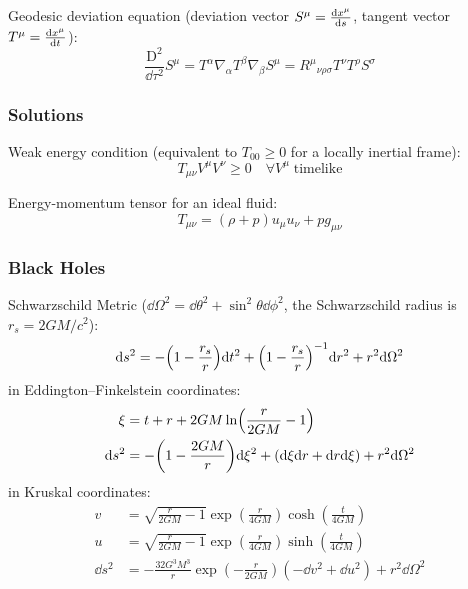 			\noindent
			Geodesic deviation equation (deviation vector $S^\mu = \dv{x^\mu}{s}$, tangent vector $T^\mu = \dv{x^\mu}{t}$):
			\begin{equation}
				\frac{\mathrm{D}^2}{\dd \tau^2} S^\mu
				= T^\alpha \nabla_\alpha T^\beta \nabla_\beta S^\mu
				= R^\mu{}_{\nu\rho\sigma} T^\nu T^\rho S^\sigma
			\end{equation}


		\subsubsection{Solutions}
			Weak energy condition (equivalent to $T_{00} \ge 0$ for a locally inertial frame):
			\begin{equation}
				\label{Eq:WeakEnergyCondition}
				T_{\mu\nu} V^\mu V^\nu \ge 0 \quad \forall V^\mu\;\text{timelike}
			\end{equation}

			\noindent
			Energy-momentum tensor for an ideal fluid:
			\begin{equation}
				T_{\mu\nu} = (\rho + p)u_\mu u_\nu + p g_{\mu\nu}
			\end{equation}

		\subsubsection{Black Holes}
			Schwarzschild Metric ($\dd \Omega^2 = \dd{\theta^2} + \sin^2 \theta \dd{\phi^2}$, the Schwarzschild radius is $r_s = 2 G M/c^2$):
			\begin{equation}
				\dd s^2 = - \qty(1-\frac{r_s}{r}) \dd t^2 + \qty(1 - \frac{r_s}{r})^{-1} \dd r^2 + r^2 \dd \Omega^2
			\end{equation}
			in Eddington--Finkelstein coordinates:
			\begin{equation}
				\begin{aligned}
					\xi &= t + r + 2 G M \ln(\frac{r}{2 G M} - 1) \\
					\dd s^2 &= -\qty(1-\frac{2 G M}{r}) \dd \xi^2 + (\dd \xi \dd r + \dd r \dd \xi) + r^2\dd \Omega^2
				\end{aligned}
			\end{equation}
			in Kruskal coordinates:
			\begin{equation}
				\begin{aligned}
					v &= \sqrt{\frac{r}{2 G M} - 1} \exp(\frac{r}{4 G M}) \cosh(\frac{t}{4 G M}) \\
					u &= \sqrt{\frac{r}{2 G M} - 1} \exp(\frac{r}{4 G M}) \sinh(\frac{t}{4 G M}) \\
					\dd s^2 &= -\frac{32 G^3 M^3}{r} \exp(-\frac{r}{2 G M}) (-\dd v^2 + \dd u^2) + r^2 \dd \Omega^2
				\end{aligned}
			\end{equation}

